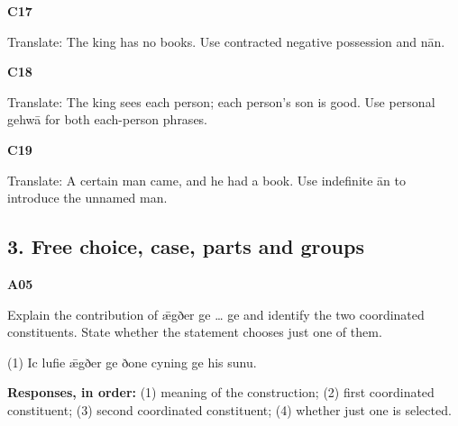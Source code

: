 \par\begin{minipage}{\linewidth}\raggedright
\textbf{C17}

Translate: The king has no books. Use contracted negative possession and nān.

\end{minipage}\par\addvspace{4pt}

\par\begin{minipage}{\linewidth}\raggedright
\textbf{C18}

Translate: The king sees each person; each person’s son is good. Use personal gehwā for both each-person phrases.

\end{minipage}\par\addvspace{4pt}

\par\begin{minipage}{\linewidth}\raggedright
\textbf{C19}

Translate: A certain man came, and he had a book. Use indefinite ān to introduce the unnamed man.

\end{minipage}\par\addvspace{4pt}

\subsection*{3. Free choice, case, parts and groups}

\par\begin{minipage}{\linewidth}\raggedright
\textbf{A05}

Explain the contribution of ǣgðer ge … ge and identify the two coordinated constituents. State whether the statement chooses just one of them.

(1) Ic lufie ǣgðer ge ðone cyning ge his sunu.

\textbf{Responses, in order:} (1) meaning of the construction; (2) first coordinated constituent; (3) second coordinated constituent; (4) whether just one is selected.

\end{minipage}\par\addvspace{4pt}

